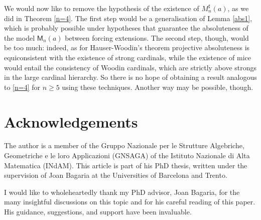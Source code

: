 \documentclass[10pt]{amsart}
\renewcommand\le\leqslant
\renewcommand\ge\geqslant
\theoremstyle{definition}
\begin{document}
We would now like to remove the hypothesis of the existence of $M_n^\sharp(a)$, as we did in Theorem \ref{n=4}. The first step would be a generalisation of Lemma \ref{abs1}, which is probably possible under hypotheses that guarantee the absoluteness of the model $\mathsf M_n(a)$ between forcing extensions. The second step, though, would be too much: indeed, as for Hauser-Woodin's theorem projective absoluteness is equiconsistent with the existence of strong cardinals, while the existence of mice would entail the consistency of Woodin cardinals, which are strictly above strongs in the large cardinal hierarchy. So there is no hope of obtaining a result analogous to \ref{n=4} for $n\ge5$ using these techniques. Another way may be possible, though.




\section*{Acknowledgements}

The author is a member of the Gruppo Nazionale per le Strutture Algebriche, Geometriche e le loro Applicazioni (GNSAGA) of the Istituto Nazionale di Alta
Matematica (INdAM). This article is part of his PhD thesis, written under the supervision of Joan Bagaria at the Universities of Barcelona and Trento.\medskip

I would like to wholeheartedly thank my PhD advisor, Joan Bagaria, for the many insightful discussions on this topic and for his careful reading of this paper. His guidance, suggestions, and support have been invaluable.\medskip
\end{document}

